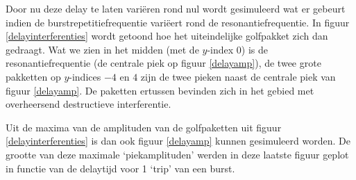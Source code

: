 Door nu deze delay te laten vari\"eren rond nul wordt gesimuleerd wat er 
gebeurt indien de burstrepetitiefrequentie vari\"eert rond de 
resonantiefrequentie. In figuur \ref{delayinterferenties} wordt getoond hoe 
het uiteindelijke golfpakket zich dan gedraagt. Wat we zien in het midden 
(met de $y$-index 0) is de resonantiefrequentie (de centrale piek op figuur 
\ref{delayamp}), de twee grote pakketten op $y$-indices $-4$ en $4$ zijn de 
twee pieken naast de centrale piek van figuur \ref{delayamp}. De paketten 
ertussen bevinden zich in het gebied met overheersend destructieve 
interferentie.


Uit de maxima van de amplituden van de golfpaketten uit figuur 
\ref{delayinterferenties} is dan ook figuur \ref{delayamp} kunnen 
gesimuleerd worden. De grootte van deze maximale `piekamplituden' werden in 
deze laatste figuur geplot in functie van de delaytijd voor 1 `trip' van 
een burst.






